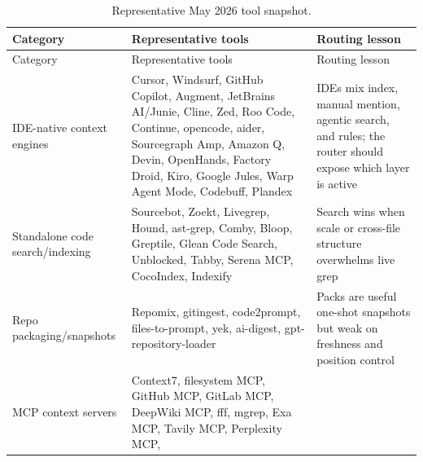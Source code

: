 \documentclass[
  11pt,
  letterpaper,
  numbers=noendperiod,
  parskip=half]{scrartcl}
\begin{document}
\begin{longtable}[]{@{}
  >{\raggedright\arraybackslash}p{}
  >{\raggedright\arraybackslash}p{}
  >{\raggedright\arraybackslash}p{}@{}}
\caption{Representative May 2026 tool
snapshot.}\label{tbl-tool-snapshot}\tabularnewline
\toprule\noalign{}
\begin{minipage}[b]{\linewidth}\raggedright
Category
\end{minipage} & \begin{minipage}[b]{\linewidth}\raggedright
Representative tools
\end{minipage} & \begin{minipage}[b]{\linewidth}\raggedright
Routing lesson
\end{minipage} \\
\midrule\noalign{}
\endfirsthead
\toprule\noalign{}
\begin{minipage}[b]{\linewidth}\raggedright
Category
\end{minipage} & \begin{minipage}[b]{\linewidth}\raggedright
Representative tools
\end{minipage} & \begin{minipage}[b]{\linewidth}\raggedright
Routing lesson
\end{minipage} \\
\midrule\noalign{}
\endhead
\bottomrule\noalign{}
\endlastfoot
IDE-native context engines & Cursor, Windsurf, GitHub Copilot, Augment,
JetBrains AI/Junie, Cline, Zed, Roo Code, Continue, opencode, aider,
Sourcegraph Amp, Amazon Q, Devin, OpenHands, Factory Droid, Kiro, Google
Jules, Warp Agent Mode, Codebuff, Plandex & IDEs mix index, manual
mention, agentic search, and rules; the router should expose which layer
is active \\
Standalone code search/indexing & Sourcebot, Zoekt, Livegrep, Hound,
ast-grep, Comby, Bloop, Greptile, Glean Code Search, Unblocked, Tabby,
Serena MCP, CocoIndex, Indexify & Search wins when scale or cross-file
structure overwhelms live grep \\
Repo packaging/snapshots & Repomix, gitingest, code2prompt,
files-to-prompt, yek, ai-digest, gpt-repository-loader & Packs are
useful one-shot snapshots but weak on freshness and position control \\
MCP context servers & Context7, filesystem MCP, GitHub MCP, GitLab MCP,
DeepWiki MCP, fff, mgrep, Exa MCP, Tavily MCP, Perplexity MCP,

\end{longtable}
\end{document}
